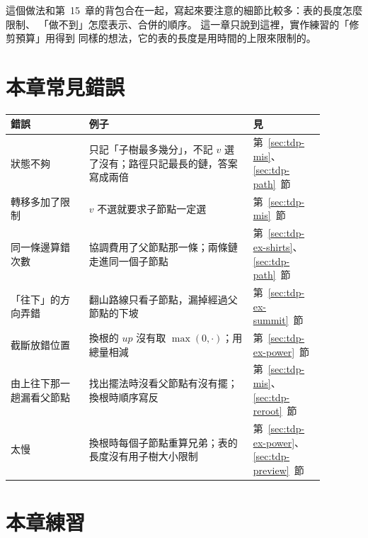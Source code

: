 這個做法和第~15~章的背包合在一起，寫起來要注意的細節比較多：表的長度怎麼限制、
「做不到」怎麼表示、合併的順序。 這一章只說到這裡，實作練習的「修剪預算」用得到
同樣的想法，它的表的長度是用時間的上限來限制的。

\section{本章常見錯誤}
\label{sec:tdp-pitfalls}

\begin{center}
\begin{tabular}{p{0.22\linewidth}p{0.46\linewidth}p{0.2\linewidth}}
\toprule
錯誤 & 例子 & 見 \\
\midrule
狀態不夠 & 只記「子樹最多幾分」，不記 $v$ 選了沒有；路徑只記最長的鏈，答案寫成兩倍 &
第~\ref{sec:tdp-mis}、\ref{sec:tdp-path}~節 \\
轉移多加了限制 & $v$ 不選就要求子節點一定選 & 第~\ref{sec:tdp-mis}~節 \\
同一條邊算錯次數 & 協調費用了父節點那一條；兩條鏈走進同一個子節點 &
第~\ref{sec:tdp-ex-shirts}、\ref{sec:tdp-path}~節 \\
「往下」的方向弄錯 & 翻山路線只看子節點，漏掉經過父節點的下坡 &
第~\ref{sec:tdp-ex-summit}~節 \\
截斷放錯位置 & 換根的 $\mathit{up}$ 沒有取 $\max(0, \cdot)$；用總量相減 &
第~\ref{sec:tdp-ex-power}~節 \\
由上往下那一趟漏看父節點 & 找出擺法時沒看父節點有沒有擺；換根時順序寫反 &
第~\ref{sec:tdp-mis}、\ref{sec:tdp-reroot}~節 \\
太慢 & 換根時每個子節點重算兄弟；表的長度沒有用子樹大小限制 &
第~\ref{sec:tdp-ex-power}、\ref{sec:tdp-preview}~節 \\
\bottomrule
\end{tabular}
\end{center}

\section{本章練習}
\label{sec:ch20-exercises}

